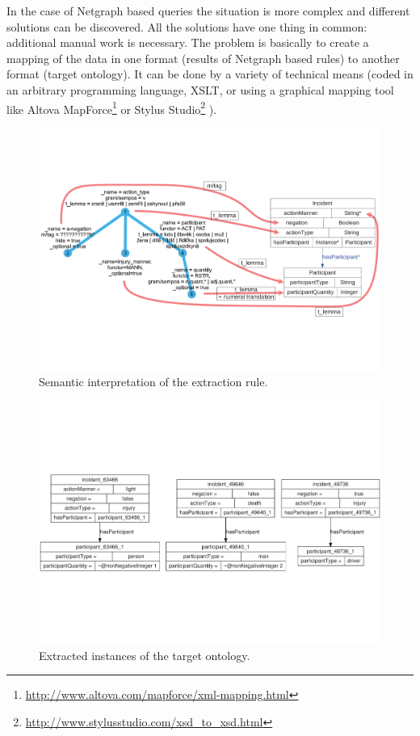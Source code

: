 In the case of Netgraph based queries the situation is more complex and different solutions can be discovered. All the solutions have one thing in common: additional manual work is necessary. The problem is basically to create a mapping of the data in one format (results of Netgraph based rules) to another format (target ontology). It can be done by a variety of technical means (coded in an arbitrary programming language, XSLT, or using a graphical mapping tool like 
Altova MapForce\footnote{\url{http://www.altova.com/mapforce/xml-mapping.html}}
or
Stylus Studio\footnote{\url{http://www.stylusstudio.com/xsd_to_xsd.html}}
). 



\begin{figure}
	\centering
		\includegraphics[angle=-90, width=0.9\hsize]{semantic_interpretation}
	\caption{Semantic interpretation of the extraction rule.}
	\label{fig:manual_semantic_interpretation}
\end{figure}


\begin{figure}
	\centering
		\includegraphics[angle=-90, width=\hsize]{instances}
	\caption{Extracted instances of the target ontology.}
	\label{fig:manual_instatnces}
\end{figure}

